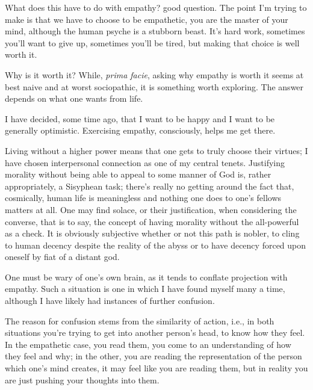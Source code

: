\documentclass[../butidigress.tex]{subfiles}
\begin{document}
What does this have to do with empathy? good question.
The point I'm trying to make is that we have to choose to be empathetic, you are the master of your mind, although the human psyche is a stubborn beast.
It's hard work, sometimes you'll want to give up, sometimes you'll be tired, but making that choice is well worth it.

Why is it worth it?
While, \textit{prima facie}, asking why empathy is worth it seems at best naive and at worst sociopathic, it is something worth exploring.
The answer depends on what one wants from life.

I have decided, some time ago, that I want to be happy and I want to be generally optimistic.
Exercising empathy, consciously, helps me get there.

Living without a higher power means that one gets to truly choose their virtues; I have chosen interpersonal connection as one of my central tenets.
Justifying morality without being able to appeal to some manner of God is, rather appropriately, a Sisyphean task; there's really no getting around the fact that, cosmically, human life is meaningless and nothing one does to one's fellows matters at all.
One may find solace, or their justification, when considering the converse, that is to say, the concept of having morality without the all-powerful as a check.
It is obviously subjective whether or not this path is nobler, to cling to human decency despite the reality of the abyss or to have decency forced upon oneself by fiat of a distant god.

One must be wary of one's own brain, as it tends to conflate projection with empathy.
Such a situation is one in which I have found myself many a time, although I have likely had instances of further confusion.

The reason for confusion stems from the similarity of action, i.e., in both situations you're trying to get into another person's head, to know how they feel.
In the empathetic case, you read them, you come to an understanding of how they feel and why; in the other, you are reading the representation of the person which one's mind creates, it may feel like you are reading them, but in reality you are just pushing your thoughts into them.
\end{document}
